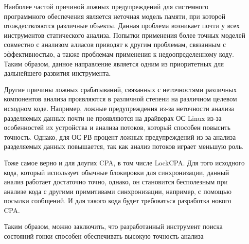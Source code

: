 Наиболее частой причиной ложных предупреждений для системного программного обеспечения является неточная модель памяти, при которой отождествляются различные объекты.
Данная проблема возникает почти у всех инструментов статического анализа. 
Попытки применения более точных моделей совместно с анализом алиасов приводят к другим проблемам, связанным с эффективностью, а также проблемам применения к недоопределенному коду.
Таким образом, данное направление является одним из приоритетных для дальнейшего развития инструмента.

Другие причины ложных срабатываний, связанных с неточностями различных компонентов анализа проявляются в различной степени на различном целевом исходном коде. 
Например, ложные предупреждения из-за неточности анализа разделяемых данных почти не проявляются на драйверах ОС Linux из-за особенностей их устройства и анализа потоков, который способен повысить точность.
Однако, для ОС РВ процент ложных предупреждений из-за анализа разделяемых данных повышается, так как анализ потоков играет меньшую роль.

Тоже самое верно и для длугих CPA, в том числе LockCPA. Для того исходного кода, который использует обычные блокировки для синхронизации, данный анализ работает достаточно точно, однако, он становится бесполезным при анализе кода с другими примитивами синхронизации, например, с помощью посылки сообщений.
И для такого кода будет требоваться разработка нового CPA.

Таким образом, можно заключить, что разработанный инструмент поиска состояний гонки способен обеспечивать высокую точность анализа

\clearpage